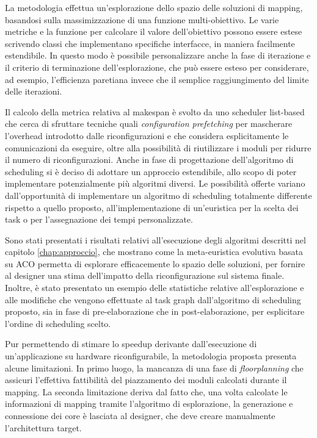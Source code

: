 La metodologia effettua un'esplorazione dello spazio delle soluzioni di mapping, basandosi
sulla massimizzazione di una funzione multi-obiettivo. Le varie metriche e la funzione per calcolare
il valore dell'obiettivo possono essere estese scrivendo classi che implementano specifiche interfacce, in maniera facilmente
estendibile. In questo modo \`e possibile personalizzare anche la fase di iterazione e il criterio di terminazione
dell'esplorazione, che pu\`o essere esteso per considerare, ad esempio, l'efficienza
paretiana invece che il semplice raggiungimento del limite delle iterazioni.

Il calcolo della metrica relativa al \mbox{makespan} \`e svolto da uno scheduler list-based che cerca
di sfruttare tecniche quali \emph{configuration prefetching} per mascherare l'overhead introdotto dalle
riconfigurazioni e che considera esplicitamente le comunicazioni da eseguire, oltre
alla possibilit\`a di riutilizzare i moduli per ridurre il numero di riconfigurazioni.
Anche in fase di progettazione dell'algoritmo di scheduling si \`e deciso di adottare
un approccio estendibile, allo scopo di poter implementare potenzialmente pi\`u algoritmi diversi.
Le possibilit\`a offerte variano dall'opportunit\`a di implementare un algoritmo di scheduling
totalmente differente rispetto a quello proposto, all'implementazione di un'euristica per la scelta dei
task o per l'assegnazione dei tempi personalizzate.

Sono stati presentati i risultati relativi all'esecuzione degli algoritmi descritti
nel capitolo \ref{chap:approccio}, che mostrano come la meta-euristica evolutiva basata
su \acl{ACO} permetta di esplorare efficacemente lo spazio delle soluzioni,
per fornire al designer una stima dell'impatto della riconfigurazione sul sistema finale.
Inoltre, \`e stato presentato un esempio delle statistiche relative all'esplorazione
e alle modifiche che vengono effettuate al task graph dall'algoritmo di scheduling proposto,
sia in fase di pre-elaborazione che in post-elaborazione, per esplicitare l'ordine di scheduling
scelto.

Pur permettendo di stimare lo speedup derivante dall'esecuzione di un'applicazione su hardware riconfigurabile,
la metodologia proposta presenta alcune limitazioni. In primo luogo,
la mancanza di una fase di \emph{floorplanning} che assicuri
l'effettiva fattibilit\`a del piazzamento dei moduli calcolati durante il mapping.
La seconda limitazione deriva dal fatto che, una volta calcolate le informazioni di mapping
tramite l'algoritmo di esplorazione, la generazione e connessione dei core \`e lasciata
al designer, che deve creare manualmente l'architettura target.

